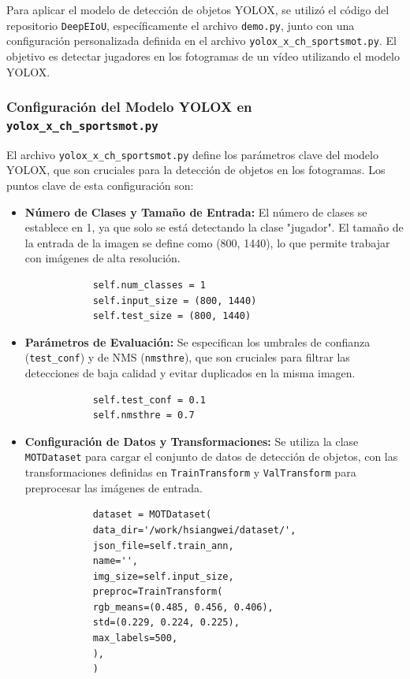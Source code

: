 \documentclass[12pt, a4paper, twoside]{article}
\begin{document}
	Para aplicar el modelo de detección de objetos YOLOX, se utilizó el código del repositorio \texttt{DeepEIoU}, específicamente el archivo \texttt{demo.py}, junto con una configuración personalizada definida en el archivo \texttt{yolox\_x\_ch\_sportsmot.py}. El objetivo es detectar jugadores en los fotogramas de un vídeo utilizando el modelo YOLOX.
	
	\subsubsection{Configuración del Modelo YOLOX en \texttt{yolox\_x\_ch\_sportsmot.py}}
	
	El archivo \texttt{yolox\_x\_ch\_sportsmot.py} define los parámetros clave del modelo YOLOX, que son cruciales para la detección de objetos en los fotogramas. Los puntos clave de esta configuración son:
	
	\begin{itemize}
		\item \textbf{Número de Clases y Tamaño de Entrada:} El número de clases se establece en 1, ya que solo se está detectando la clase "jugador". El tamaño de la entrada de la imagen se define como (800, 1440), lo que permite trabajar con imágenes de alta resolución.
		\begin{verbatim}
			self.num_classes = 1
			self.input_size = (800, 1440)
			self.test_size = (800, 1440)
		\end{verbatim}
		
		\item \textbf{Parámetros de Evaluación:} Se especifican los umbrales de confianza (\texttt{test\_conf}) y de NMS (\texttt{nmsthre}), que son cruciales para filtrar las detecciones de baja calidad y evitar duplicados en la misma imagen.
		\begin{verbatim}
			self.test_conf = 0.1
			self.nmsthre = 0.7
		\end{verbatim}
		
		\item \textbf{Configuración de Datos y Transformaciones:} Se utiliza la clase \texttt{MOTDataset} para cargar el conjunto de datos de detección de objetos, con las transformaciones definidas en \texttt{TrainTransform} y \texttt{ValTransform} para preprocesar las imágenes de entrada.
		\begin{verbatim}
			dataset = MOTDataset(
			data_dir='/work/hsiangwei/dataset/',
			json_file=self.train_ann,
			name='',
			img_size=self.input_size,
			preproc=TrainTransform(
			rgb_means=(0.485, 0.456, 0.406),
			std=(0.229, 0.224, 0.225),
			max_labels=500,
			),
			)
		\end{verbatim}
	\end{itemize}
	
\end{document}
